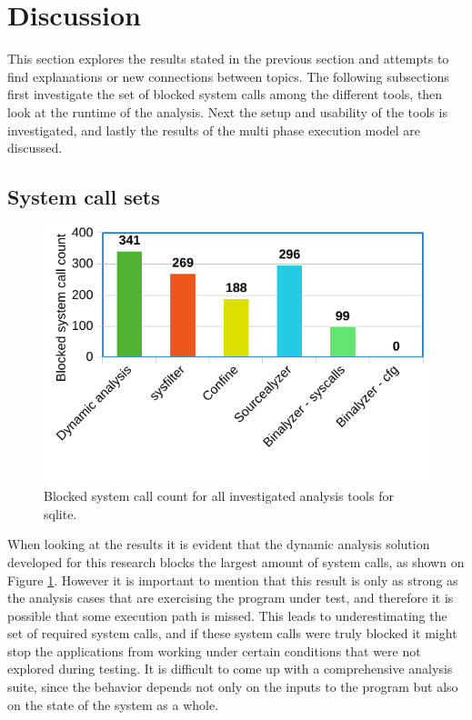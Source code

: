 \section{Discussion}
\label{sec:discussion}
This section explores the results stated in the previous section and attempts to find explanations or new connections between topics.
The following subsections first investigate the set of blocked system calls among the different tools, then look at the runtime of the analysis.
Next the setup and usability of the tools is investigated, and lastly the results of the multi phase execution model are discussed.

\subsection {System call sets}
\begin{figure}
    \centering
    \includegraphics[width=\columnwidth]{./chart_syscalls.png}
    \caption{Blocked system call count for all investigated analysis tools for sqlite.}
    \label{fig:block_count}
\end{figure}
When looking at the results it is evident that the dynamic analysis solution developed for this research blocks the largest amount of system calls, as shown on Figure \ref{fig:block_count}.
However it is important to mention that this result is only as strong as the analysis cases that are exercising the program under test, and therefore it is possible that some execution path is missed.
This leads to underestimating the set of required system calls, and if these system calls were truly blocked it might stop the applications from working under certain conditions that were not explored during testing.
It is difficult to come up with a comprehensive analysis suite, since the behavior depends not only on the inputs to the program but also on the state of the system as a whole.

